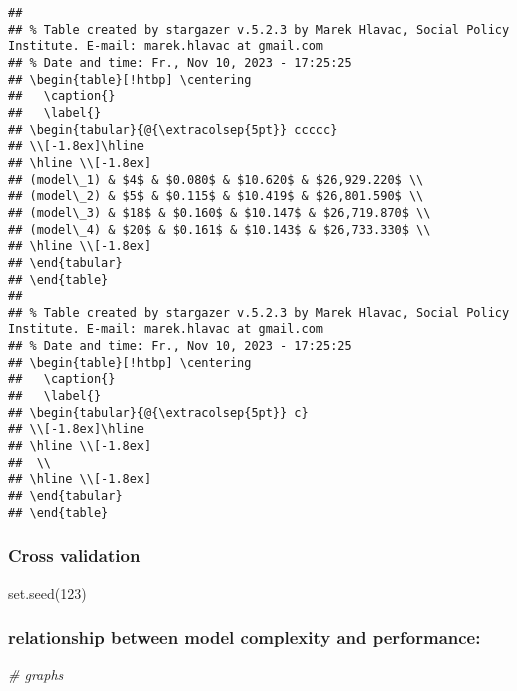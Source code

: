 \documentclass[
]{article}
\newenvironment{Shaded}{\begin{snugshade}}{\end{snugshade}}
\newcommand{\CommentTok}[1]{\textcolor[rgb]{0.56,0.35,0.01}{\textit{#1}}}
\newcommand{\DecValTok}[1]{\textcolor[rgb]{0.00,0.00,0.81}{#1}}
\newcommand{\FunctionTok}[1]{\textcolor[rgb]{0.00,0.00,0.00}{#1}}
\newcommand{\NormalTok}[1]{#1}
\begin{document}
\begin{verbatim}
## 
## % Table created by stargazer v.5.2.3 by Marek Hlavac, Social Policy Institute. E-mail: marek.hlavac at gmail.com
## % Date and time: Fr., Nov 10, 2023 - 17:25:25
## \begin{table}[!htbp] \centering 
##   \caption{} 
##   \label{} 
## \begin{tabular}{@{\extracolsep{5pt}} ccccc} 
## \\[-1.8ex]\hline 
## \hline \\[-1.8ex] 
## (model\_1) & $4$ & $0.080$ & $10.620$ & $26,929.220$ \\ 
## (model\_2) & $5$ & $0.115$ & $10.419$ & $26,801.590$ \\ 
## (model\_3) & $18$ & $0.160$ & $10.147$ & $26,719.870$ \\ 
## (model\_4) & $20$ & $0.161$ & $10.143$ & $26,733.330$ \\ 
## \hline \\[-1.8ex] 
## \end{tabular} 
## \end{table} 
## 
## % Table created by stargazer v.5.2.3 by Marek Hlavac, Social Policy Institute. E-mail: marek.hlavac at gmail.com
## % Date and time: Fr., Nov 10, 2023 - 17:25:25
## \begin{table}[!htbp] \centering 
##   \caption{} 
##   \label{} 
## \begin{tabular}{@{\extracolsep{5pt}} c} 
## \\[-1.8ex]\hline 
## \hline \\[-1.8ex] 
##  \\ 
## \hline \\[-1.8ex] 
## \end{tabular} 
## \end{table}
\end{verbatim}

\hypertarget{cross-validation}{%
\subsubsection{Cross validation}\label{cross-validation}}

\begin{Shaded}
\begin{Highlighting}[]
\FunctionTok{set.seed}\NormalTok{(}\DecValTok{123}\NormalTok{)}
\end{Highlighting}
\end{Shaded}

\hypertarget{relationship-between-model-complexity-and-performance}{%
\subsubsection{relationship between model complexity and
performance:}\label{relationship-between-model-complexity-and-performance}}

\begin{Shaded}
\begin{Highlighting}[]
\CommentTok{\# graphs }
\end{Highlighting}
\end{Shaded}
\end{document}
